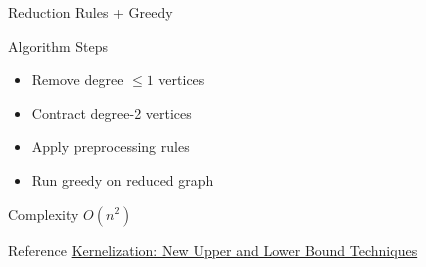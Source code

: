 \documentclass[aspectratio=169]{beamer}
\begin{document}
\begin{frame}{Reduction Rules + Greedy}

\begin{block}{Algorithm Steps}
\begin{itemize}
\item Remove degree $\leq 1$ vertices
\item Contract degree-2 vertices
\item Apply preprocessing rules
\item Run greedy on reduced graph
\end{itemize}
\end{block}

\begin{exampleblock}{Complexity}
$O(n^2)$
\end{exampleblock}

\begin{alertblock}{Reference}
\href{https://link.springer.com/chapter/10.1007/978-3-642-11269-0_2}{Kernelization: New Upper and Lower Bound Techniques}
\end{alertblock}

\end{frame}

\end{document}
